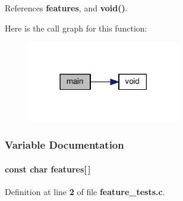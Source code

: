 References {\bf features}, and {\bf void()}.



Here is the call graph for this function\+:
\nopagebreak
\begin{figure}[H]
\begin{center}
\leavevmode
\includegraphics[width=189pt]{dd/d09/gr-radar-dev_2build_2CMakeFiles_2feature__tests_8c_a3c04138a5bfe5d72780bb7e82a18e627_cgraph}
\end{center}
\end{figure}




\subsubsection{Variable Documentation}
\paragraph[{features}]{\setlength{\rightskip}{0pt plus 5cm}const char features[$\,$]}\label{gr-radar-dev_2build_2CMakeFiles_2feature__tests_8c_a1582568e32f689337602a16bf8a5bff0}


Definition at line {\bf 2} of file {\bf feature\+\_\+tests.\+c}.

